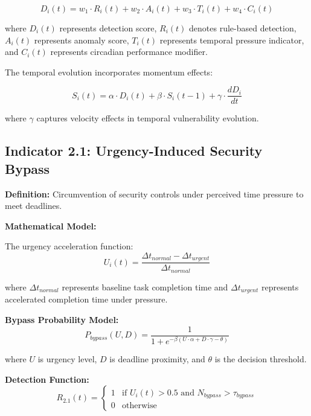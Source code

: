 \documentclass[11pt,a4paper]{article}
\begin{document}
\begin{equation}
D_i(t) = w_1 \cdot R_i(t) + w_2 \cdot A_i(t) + w_3 \cdot T_i(t) + w_4 \cdot C_i(t)
\end{equation}

where $D_i(t)$ represents detection score, $R_i(t)$ denotes rule-based detection, $A_i(t)$ represents anomaly score, $T_i(t)$ represents temporal pressure indicator, and $C_i(t)$ represents circadian performance modifier.

The temporal evolution incorporates momentum effects:

\begin{equation}
S_i(t) = \alpha \cdot D_i(t) + \beta \cdot S_i(t-1) + \gamma \cdot \frac{dD_i}{dt}
\end{equation}

where $\gamma$ captures velocity effects in temporal vulnerability evolution.

\subsection{Indicator 2.1: Urgency-Induced Security Bypass}

\textbf{Definition:} Circumvention of security controls under perceived time pressure to meet deadlines.

\textbf{Mathematical Model:}

The urgency acceleration function:
\begin{equation}
U_i(t) = \frac{\Delta t_{normal} - \Delta t_{urgent}}{\Delta t_{normal}}
\end{equation}

where $\Delta t_{normal}$ represents baseline task completion time and $\Delta t_{urgent}$ represents accelerated completion time under pressure.

\textbf{Bypass Probability Model:}
\begin{equation}
P_{bypass}(U,D) = \frac{1}{1 + e^{-\beta(U \cdot \alpha + D \cdot \gamma - \theta)}}
\end{equation}

where $U$ is urgency level, $D$ is deadline proximity, and $\theta$ is the decision threshold.

\textbf{Detection Function:}
\begin{equation}
R_{2.1}(t) = \begin{cases}
1 & \text{if } U_i(t) > 0.5 \text{ and } N_{bypass} > \tau_{bypass} \\
0 & \text{otherwise}
\end{cases}
\end{equation}
\end{document}
